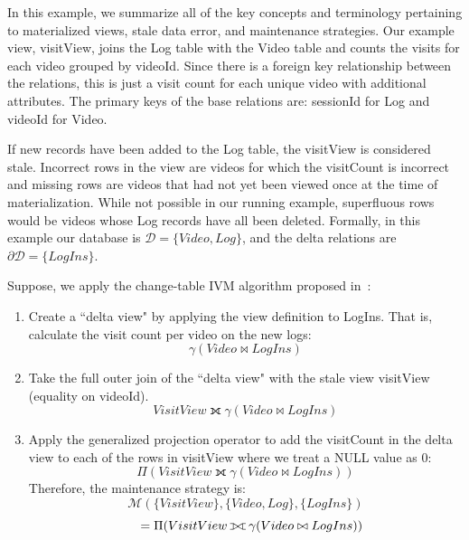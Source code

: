 \vspace{0.25em}

\begin{example}\label{concepts}
In this example, we summarize all of the key concepts and terminology pertaining to materialized views, stale data error, and maintenance strategies.
Our example view, visitView, joins the Log table with the Video table and counts the visits for each video grouped by videoId.
Since there is a foreign key relationship between the relations, this is just a visit count for each unique video with additional attributes. 
The primary keys of the base relations are: sessionId for Log and videoId for Video.

If new records have been added to the Log table, the visitView is considered stale.
Incorrect rows in the view are videos for which the visitCount is incorrect and missing rows are videos that had not yet been viewed once at the time of materialization. 
While not possible in our running example, superfluous rows would be videos whose Log records have all been deleted.
Formally, in this example our database is $\mathcal{D}=\{Video, Log\}$, and the delta relations are $\partial\mathcal{D}=\{LogIns\}$. 

Suppose, we apply the change-table IVM algorithm proposed in~\cite{gupta1995maintenance}:
\vspace{-.55em}
\begin{enumerate}[noitemsep]
\item Create a ``delta view" by applying the view definition to LogIns. That is, calculate the visit count per video on the new logs:
\[
 \gamma(Video \bowtie LogIns)
\]
\item Take the full outer join of the ``delta view" with the stale view visitView (equality on videoId).
\[
 VisitView \fullouterjoin \gamma(Video \bowtie LogIns)
\]
\item Apply the generalized projection operator to add the visitCount in the delta view to each of the rows in visitView where we treat a NULL value as 0: 
\[
 \Pi (VisitView \fullouterjoin \gamma(Video \bowtie LogIns))
\]
Therefore, the maintenance strategy is:
\[
 \mathcal{M}(\{VisitView\},\{Video, Log\}, \{LogIns\})
\]
\[
\text{\hspace{0.7em}} = \Pi (VisitView \fullouterjoin \gamma(Video \bowtie LogIns))
\]
\end{enumerate}

\end{example}


